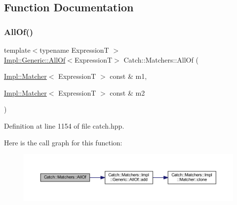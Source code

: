 \subsection{Function Documentation}
\hypertarget{namespace_catch_1_1_matchers_aca6c1c17e137d989583c97f99705797a}{}\label{namespace_catch_1_1_matchers_aca6c1c17e137d989583c97f99705797a} 
\subsubsection{\texorpdfstring{All\+Of()}{AllOf()}\hspace{0.1cm}{\footnotesize\ttfamily [1/2]}}
{\footnotesize\ttfamily template$<$typename ExpressionT $>$ \\
\hyperlink{class_catch_1_1_matchers_1_1_impl_1_1_generic_1_1_all_of}{Impl\+::\+Generic\+::\+All\+Of}$<$ExpressionT$>$ Catch\+::\+Matchers\+::\+All\+Of (\begin{DoxyParamCaption}\item[{\hyperlink{struct_catch_1_1_matchers_1_1_impl_1_1_matcher}{Impl\+::\+Matcher}$<$ ExpressionT $>$ const \&}]{m1,  }\item[{\hyperlink{struct_catch_1_1_matchers_1_1_impl_1_1_matcher}{Impl\+::\+Matcher}$<$ ExpressionT $>$ const \&}]{m2 }\end{DoxyParamCaption})\hspace{0.3cm}{\ttfamily [inline]}}



Definition at line 1154 of file catch.\+hpp.

Here is the call graph for this function\+:\nopagebreak
\begin{figure}[H]
\begin{center}
\leavevmode
\includegraphics[width=350pt]{namespace_catch_1_1_matchers_aca6c1c17e137d989583c97f99705797a_cgraph}
\end{center}
\end{figure}
\hypertarget{namespace_catch_1_1_matchers_a990366f7d62d10d9752ad7b24230def0}{}\label{namespace_catch_1_1_matchers_a990366f7d62d10d9752ad7b24230def0} 
